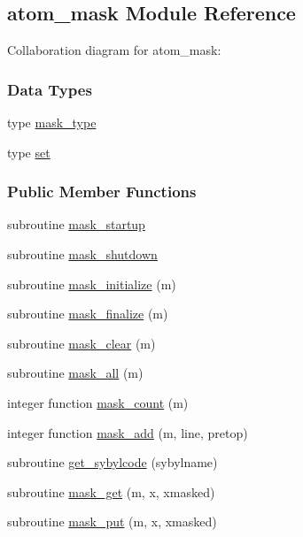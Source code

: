 \hypertarget{classatom__mask}{\subsection{atom\-\_\-mask Module Reference}
\label{classatom__mask}
}


Collaboration diagram for atom\-\_\-mask\-:
\subsubsection*{Data Types}
\begin{DoxyCompactItemize}
\item 
type \hyperlink{structatom__mask_1_1mask__type}{mask\-\_\-type}
\item 
type \hyperlink{structatom__mask_1_1set}{set}
\end{DoxyCompactItemize}
\subsubsection*{Public Member Functions}
\begin{DoxyCompactItemize}
\item 
subroutine \hyperlink{classatom__mask_a5499bfab148e68b797181ace7ee2e744}{mask\-\_\-startup}
\item 
subroutine \hyperlink{classatom__mask_a14396a493fa6fda90515fd946a68e90b}{mask\-\_\-shutdown}
\item 
subroutine \hyperlink{classatom__mask_a37135eea76c381c4aacee5cc9fbce046}{mask\-\_\-initialize} (m)
\item 
subroutine \hyperlink{classatom__mask_a7059cec5e1eecb2536e9cac6d5fb8ce0}{mask\-\_\-finalize} (m)
\item 
subroutine \hyperlink{classatom__mask_aa33256b4eb2abd74f319e47e7f9c67b8}{mask\-\_\-clear} (m)
\item 
subroutine \hyperlink{classatom__mask_a06d37d41eecfbd40fcaf33218b64bd57}{mask\-\_\-all} (m)
\item 
integer function \hyperlink{classatom__mask_af6beca866515e72f29c7ec884d8672cc}{mask\-\_\-count} (m)
\item 
integer function \hyperlink{classatom__mask_ad0a7fae4495fbbde287b61adf5b41d62}{mask\-\_\-add} (m, line, pretop)
\item 
subroutine \hyperlink{classatom__mask_a517aeb28af6ea93d97770ace5268b5ee}{get\-\_\-sybylcode} (sybylname)
\item 
subroutine \hyperlink{classatom__mask_a9fb5742f563c05202fb3ac7175f80196}{mask\-\_\-get} (m, x, xmasked)
\item 
subroutine \hyperlink{classatom__mask_acf07e23d62def4b7355c98065ba086ea}{mask\-\_\-put} (m, x, xmasked)
\end{DoxyCompactItemize}
